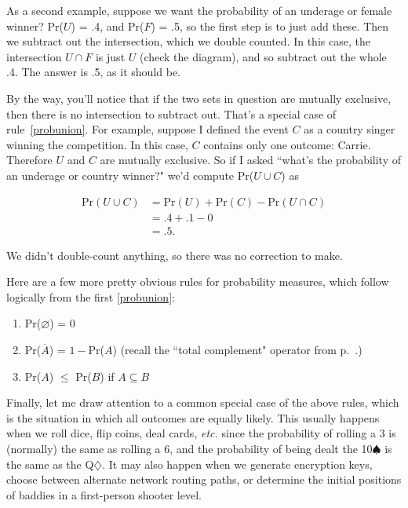 As a second example, suppose we want the probability of an underage or
female winner? Pr($U$) = .4, and Pr($F$) = .5, so the first step is to just
add these. Then we subtract out the intersection, which we double counted.
In this case, the intersection $U \cap F$ is just $U$ (check the diagram),
and so subtract out the whole .4. The answer is .5, as it should be.

By the way, you'll notice that if the two sets in question are mutually
exclusive, then there is no intersection to subtract out. That's a special
case of rule~\ref{probunion}. For example, suppose I defined the event $C$
as a country singer winning the competition. In this case, $C$ contains
only one outcome: Carrie. Therefore $U$ and $C$ are mutually exclusive. So
if I asked ``what's the probability of an underage or country winner?" we'd
compute Pr($U \cup C$) as 

\begin{align*}
\text{Pr}(U \cup C) &= \text{Pr}(U) + \text{Pr}(C) - \text{Pr}(U \cap C) \\
&= .4 + .1 - 0 \\
&= .5.
\end{align*}

We didn't double-count anything, so there was no correction to make.

Here are a few more pretty obvious rules for probability measures, which
follow logically from the first \ref{probunion}:

\begin{enumerate}[resume]
\item Pr($\varnothing$) = 0 
\item Pr($\overline{A}$) = $1-$Pr($A$) \quad (recall the ``total complement"
operator from p.~\pageref{complement}.)
\item Pr($A$) $\leq$ Pr($B$) if $A \subseteq B$
\end{enumerate}

Finally, let me draw attention to a common special case of the above rules,
which is the situation in which all outcomes are equally likely. This
usually happens when we roll dice, flip coins, deal cards, \textit{etc.}
since the probability of rolling a 3 is (normally) the same as rolling a 6,
and the probability of being dealt the 10$\spadesuit$ is the same as the
Q$\diamondsuit$. It may also happen when we generate encryption keys,
choose between alternate network routing paths, or determine the initial
positions of baddies in a first-person shooter level.


